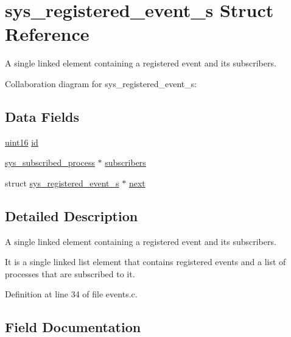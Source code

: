 \hypertarget{structsys__registered__event__s}{}\section{sys\+\_\+registered\+\_\+event\+\_\+s Struct Reference}
\label{structsys__registered__event__s}


A single linked element containing a registered event and its subscribers.  




Collaboration diagram for sys\+\_\+registered\+\_\+event\+\_\+s\+:
\subsection*{Data Fields}
\begin{DoxyCompactItemize}
\item 
\hyperlink{definitions_8h_a05f6b0ae8f6a6e135b0e290c25fe0e4e}{uint16} \hyperlink{structsys__registered__event__s_a44886c67a44aee553cbbbcd9903fcd39}{id}
\item 
\hyperlink{events_8c_a855a9b5c8c07fedd9f2a8bbf5ee9b4f0}{sys\+\_\+subscribed\+\_\+process} $\ast$ \hyperlink{structsys__registered__event__s_acea93fade98b2e5bd81cc9b6ed35388d}{subscribers}
\item 
struct \hyperlink{structsys__registered__event__s}{sys\+\_\+registered\+\_\+event\+\_\+s} $\ast$ \hyperlink{structsys__registered__event__s_a084bfc795b0f5135b6439a28bf9920c1}{next}
\end{DoxyCompactItemize}


\subsection{Detailed Description}
A single linked element containing a registered event and its subscribers. 

It is a single linked list element that contains registered events and a list of processes that are subscribed to it. 

Definition at line 34 of file events.\+c.



\subsection{Field Documentation}
\hypertarget{structsys__registered__event__s_a44886c67a44aee553cbbbcd9903fcd39}{}
